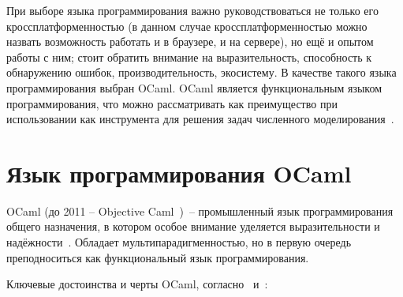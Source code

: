 При выборе языка программирования важно руководствоваться не только его кроссплатформенностью
(в данном случае кроссплатформенностью можно назвать возможность работать и в браузере, и на сервере),
но ещё и опытом работы с ним; стоит обратить внимание на выразительность, способность к обнаружению ошибок,
производительность, экосистему. В качестве такого языка программирования выбран OCaml.
OCaml является функциональным языком программирования, что можно рассматривать как преимущество
при использовании как инструмента для решения задач численного моделирования~\cite{shutov-haskell}.

\section{Язык программирования OCaml}

OCaml (до 2011 -- Objective Caml~\cite{camlhistory})~-- промышленный язык программирования общего назначения,
в котором особое внимание уделяется выразительности и надёжности~\cite{ocamlorg}. Обладает
мультипарадигменностью, но в первую очередь преподноситься как функциональный язык программирования.

Ключевые достоинства и черты OCaml, согласно~\cite[с.~3]{yaron2011} и~\cite{rwo-prologue}:


